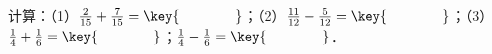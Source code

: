
计算：（1）$\frac{2}{15}+\frac{7}{15}=\key{\hspace{4em}}$；（2）$\frac{11}{12}-\frac{5}{12}=\key{\hspace{4em}}$；（3）$\frac{1}{4}+\frac{1}{6}=\key{\hspace{4em}}$；$\frac{1}{4}-\frac{1}{6}=\key{\hspace{4em}}$．
